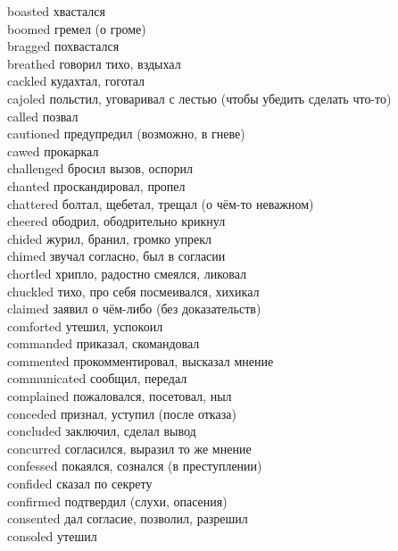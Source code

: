 \documentclass[a4paper,12pt,fleqn]{book}\usepackage{polyglossia}\setdefaultlanguage[babelshorthands=true]{russian}\setotherlanguage{english}\defaultfontfeatures{Ligatures=TeX,Mapping=tex-text}\usepackage{xcolor}\newcommand{\ml}[3]{#2}
\begin{document}
{boasted \hfill хвастался\\
boomed \hfill гремел (о громе)\\
bragged \hfill похвастался\\
breathed \hfill говорил тихо, вздыхал\\
cackled \hfill кудахтал, гоготал\\
cajoled \hfill польстил, уговаривал с лестью (чтобы убедить сделать что-то)\\
called \hfill позвал\\
cautioned \hfill предупредил (возможно, в гневе)\\
cawed \hfill прокаркал\\
challenged \hfill бросил вызов, оспорил\\
chanted \hfill проскандировал, пропел\\
chattered \hfill болтал, щебетал, трещал (о чём-то неважном)\\
cheered \hfill ободрил, ободрительно крикнул\\
chided \hfill журил, бранил, громко упрекл\\
chimed \hfill звучал согласно, был в согласии\\
chortled \hfill хрипло, радостно смеялся, ликовал\\
chuckled \hfill тихо, про себя посмеивался, хихикал\\
claimed \hfill заявил о чём-либо (без доказательств)\\
comforted \hfill утешил, успокоил\\
commanded \hfill приказал, скомандовал\\
commented \hfill прокомментировал, высказал мнение\\
communicated \hfill сообщил, передал\\
complained \hfill пожаловался, посетовал, ныл\\
conceded \hfill признал, уступил (после отказа)\\
concluded \hfill заключил, сделал вывод\\
concurred \hfill согласился, выразил то же мнение\\
confessed \hfill покаялся, сознался (в преступлении)\\
confided \hfill сказал по секрету\\
confirmed \hfill подтвердил (слухи, опасения)\\
consented \hfill дал согласие, позволил, разрешил\\
consoled \hfill утешил\\
}
\end{document}
